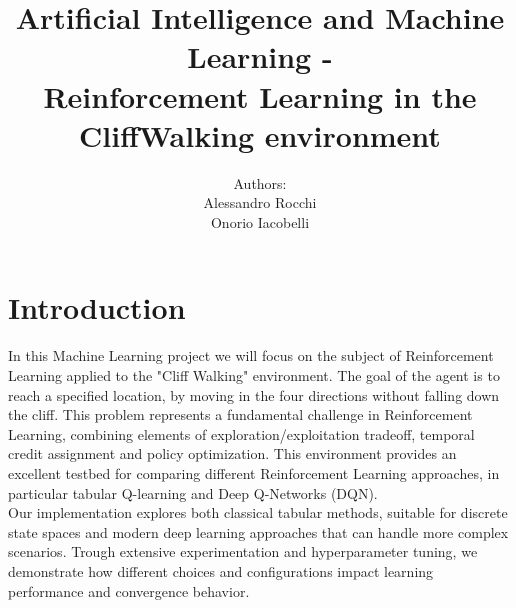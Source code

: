 \documentclass[a4paper,12pt]{article}
\title{Artificial Intelligence and Machine Learning -\\Reinforcement Learning in the CliffWalking environment}
\date{}
\author{Authors:\\Alessandro Rocchi\\Onorio Iacobelli}
\begin{document}
\maketitle

\tableofcontents

\section{Introduction}
In this Machine Learning project we will focus on the subject of Reinforcement Learning applied to the "Cliff Walking" environment. The goal of the agent is to reach a specified location, by moving in the four directions without falling down the cliff. This problem represents a fundamental challenge in Reinforcement Learning, combining elements of exploration/exploitation tradeoff, temporal credit assignment and policy optimization. This environment provides an excellent testbed for comparing different Reinforcement Learning approaches, in particular tabular Q-learning and Deep Q-Networks (DQN).
\vspace{0,5cm}\\
Our implementation explores both classical tabular methods, suitable for discrete state spaces and modern deep learning approaches that can handle more complex scenarios. Trough extensive experimentation and hyperparameter tuning, we demonstrate how different choices and configurations impact learning performance and convergence behavior. 
\end{document}
